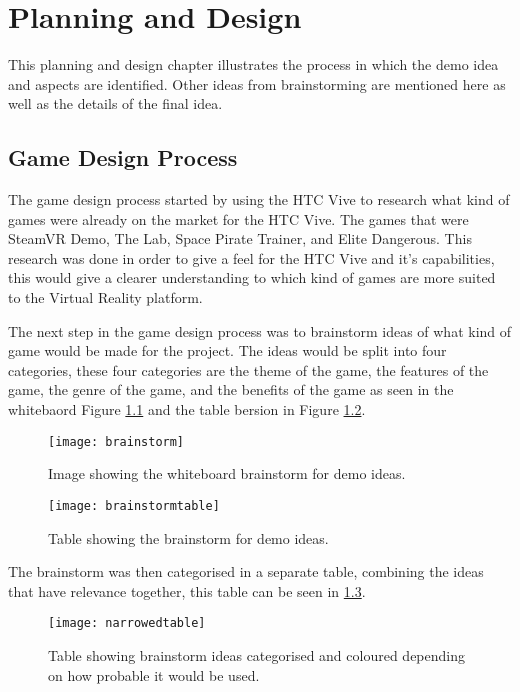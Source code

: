 \chapter{Planning and Design}
\label{chapter5}

This planning and design chapter illustrates the process in which the demo idea and aspects are identified. Other ideas from brainstorming are mentioned here as well as the details of the final idea.

\section{Game Design Process}
The game design process started by using the HTC Vive to research what kind of games were already on the market for the HTC Vive. The games that were SteamVR Demo\cite{steamvr}, The Lab\cite{thelab}, Space Pirate Trainer\cite{spacepiratetrainer}, and Elite Dangerous\cite{elitedangerous}. This research was done in order to give a feel for the HTC Vive and it's capabilities, this would give a clearer understanding to which kind of games are more suited to the Virtual Reality platform.
\newline
\par
The next step in the game design process was to brainstorm ideas of what kind of game would be made for the project. The ideas would be split into four categories, these four categories are the theme of the game, the features of the game, the genre of the game, and the benefits of the game as seen in the whitebaord Figure \ref{fig:brainstorm} and the table bersion in Figure \ref{fig:brainstormtable}.

\begin{figure}[ht]
	\texttt{[image: brainstorm]}
	\centering
	\caption{Image showing the whiteboard brainstorm for demo ideas.}
	\label{fig:brainstorm}
\end{figure}

\begin{figure}[hb]
	\texttt{[image: brainstormtable]}
	\centering
	\caption{Table showing the brainstorm for demo ideas.}
	\label{fig:brainstormtable}
\end{figure}

\clearpage
The brainstorm was then categorised in a separate table, combining the ideas that have relevance together, this table can be seen in \ref{fig:narrowedtable}.

\begin{figure}[H]
	\texttt{[image: narrowedtable]}
	\centering
	\caption{Table showing brainstorm ideas categorised and coloured depending on how probable it would be used.}
	\label{fig:narrowedtable}
\end{figure}

